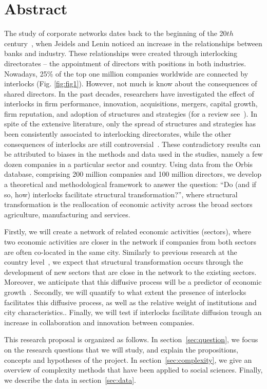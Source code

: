 \section{Abstract}
\label{sec:description}
The study of corporate networks dates back to the beginning of the 20$th$ century~\citep{jeidels1905,Lenin1917},
when Jeidels and Lenin noticed an increase in the relationships between banks and industry. 
These relationships were created through interlocking directorates -- the appointment of directors with positions in both industries.
Nowadays, 25\% of the top one million companies worldwide are connected by interlocks (Fig. \ref{fig:fig1}).
However, not much is know about the consequences of shared directors.
In the past decades, researchers have investigated the effect of interlocks in firm performance, innovation, acquisitions, mergers, capital growth, firm reputation, and adoption of structures and strategies (for a review see~\cite{Mizruchi1996}).
In spite of the extensive literature,  
only the spread of structures and strategies has been consistently associated to interlocking directorates\citep{Haunschild1993,Davis1997,Davis1991,Rao1999},
while the other consequences of interlocks are still controversial~\cite{Mizruchi1996}.
These contradictory results can be attributed to biases in the methods and data used in the studies,
namely a few dozen companies in a particular sector and country.
Using data from the Orbis database, 
comprising 200 million companies and 100 million directors, 
we develop a theoretical and methodological framework to answer the question:
``Do (and if so, how) interlocks facilitate structural transformation?'',
where structural transformation is the reallocation of economic activity across the broad sectors agriculture, manufacturing and services.

Firstly, we will create a network of related economic activities (sectors),
where two economic activities are closer in the network if companies from both sectors are often co-located in the same city.
Similarly to previous research at the country level~\cite{hidalgo2007, hausmann2011, Hausmann2006,hidalgo2009}, 
we expect that structural transformation occurs through the development of new sectors that are close in the network to the existing sectors.
Moreover, we anticipate that this diffusive process will be a predictor of economic growth~\cite{hidalgo2009}.
Secondly, we will quantify to what extent the presence of interlocks facilitates this diffusive process,
as well as the relative weight of institutions and city characteristics..
Finally, we will test if interlocks facilitate diffusion trough an increase in collaboration and innovation between companies.


This research proposal is organized as follows. 
In section~\ref{sec:question}, we focus on the research questions that we will study,
and explain the propositions, concepts and hypotheses of the project.
In section~\ref{sec:complexity}, we give an overview of complexity methods that have been applied to social sciences.
Finally, we describe the data in section~\ref{sec:data}.



